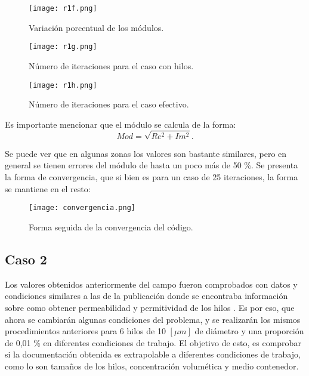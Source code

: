 \documentclass[12pt,letterpaper]{report}
\numberwithin{equation}{section}
\begin{document}
\begin{figure}[H]
	\centering\texttt{[image: r1f.png]}\\
	\caption{Variación porcentual de los módulos.}
	\label{fig:r1f}
\end{figure} 

\begin{figure}[H]
	\centering\texttt{[image: r1g.png]}\\
	\caption{Número de iteraciones para el caso con hilos.}
	\label{fig:r1g}
\end{figure} 

\begin{figure}[H]
	\centering\texttt{[image: r1h.png]}\\
	\caption{Número de iteraciones para el caso efectivo.}
	\label{fig:r1h}
\end{figure} 

Es importante mencionar que el módulo se calcula de la forma:
\begin{equation}
Mod = \sqrt{Re^2 + Im^2}.
\end{equation}

Se puede ver que en algunas zonas los valores son bastante similares, pero en general se tienen errores del módulo de hasta un poco más de 50 \%. Se presenta la forma de convergencia, que si bien es para un caso de 25 iteraciones, la forma se mantiene en el resto:

\begin{figure}[H]
	\centering\texttt{[image: convergencia.png]}\\
	\caption{Forma seguida de la convergencia del código.}
	\label{fig:convergencia}
\end{figure} 




\subsection{Caso 2}

Los valores obtenidos anteriormente del campo fueron comprobados con datos y condiciones similares a las de la publicación donde se encontraba información sobre como obtener permeabilidad y permitividad de los hilos \cite{Wire_theory_2}. Es por eso, que ahora se cambiarán algunas condiciones del problema, y se realizarán los mismos procedimientos anteriores para 6 hilos de 10 $[\mu m]$ de diámetro y una proporción de 0,01 \% en diferentes condiciones de trabajo. \cite{Wire_theory_1} El objetivo de esto, es comprobar si la documentación obtenida es extrapolable a diferentes condiciones de trabajo, como lo son tamaños de los hilos, concentración volumética y medio contenedor.
\end{document}
